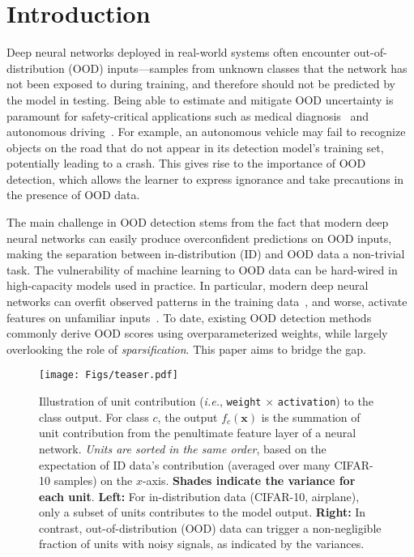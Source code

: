 \documentclass[runningheads]{llncs}
\def\*#1{\mathbf{#1}}
\begin{document}
\section{Introduction}
\label{sec:intro}
Deep neural networks deployed in real-world systems often encounter out-of-distribution (OOD) inputs---samples from unknown classes that the network has not been exposed to during training, and therefore should not be predicted by the model in testing. 
Being able to estimate and mitigate OOD uncertainty is paramount for safety-critical applications such as medical diagnosis~\cite{roy2021does,wang2017chestx} and autonomous driving~\cite{filos2020can}. For example, an autonomous vehicle may fail to recognize objects on the road that do not appear in its detection model’s training set, potentially leading to a crash. This gives rise to the importance of OOD detection, which allows the
learner to express ignorance and take precautions in the presence of OOD data.  

The main challenge in OOD detection stems from the fact that modern deep neural networks can easily produce overconfident predictions on OOD inputs, making the separation between in-distribution (ID) and OOD data a non-trivial task. The vulnerability of machine learning to OOD data can be hard-wired in high-capacity models used in practice. In particular, modern deep neural networks can overfit observed patterns in the training data~\cite{zhang2016understanding}, and worse, {activate features on unfamiliar inputs}~\cite{nguyen2015deep}. 
To date, existing OOD detection methods commonly derive OOD scores using overparameterized weights, while largely overlooking the role of \emph{sparsification}. This paper aims to bridge the gap.


\begin{figure}[t]
	\begin{center}
		\texttt{[image: Figs/teaser.pdf]}
	\end{center}
	\caption{\small Illustration of unit contribution (\emph{i.e.}, \texttt{weight} $\times$ \texttt{activation}) to the class output. For class $c$, the output $f_c(\*x)$ is the summation of unit contribution from the penultimate feature layer of a neural network. \emph{Units are sorted in the same order}, based on the expectation of ID data's contribution (averaged over many CIFAR-10 samples) on the $x$-axis. \textbf{Shades indicate the variance for each unit}. \textbf{Left:} For in-distribution data (CIFAR-10, airplane), only a subset of units contributes to the model output.  \textbf{Right:} In contrast, out-of-distribution (OOD) data can trigger a non-negligible fraction of units with noisy signals, as indicated by the variances.}
	\label{fig:whytopk}
\end{figure}
\end{document}
